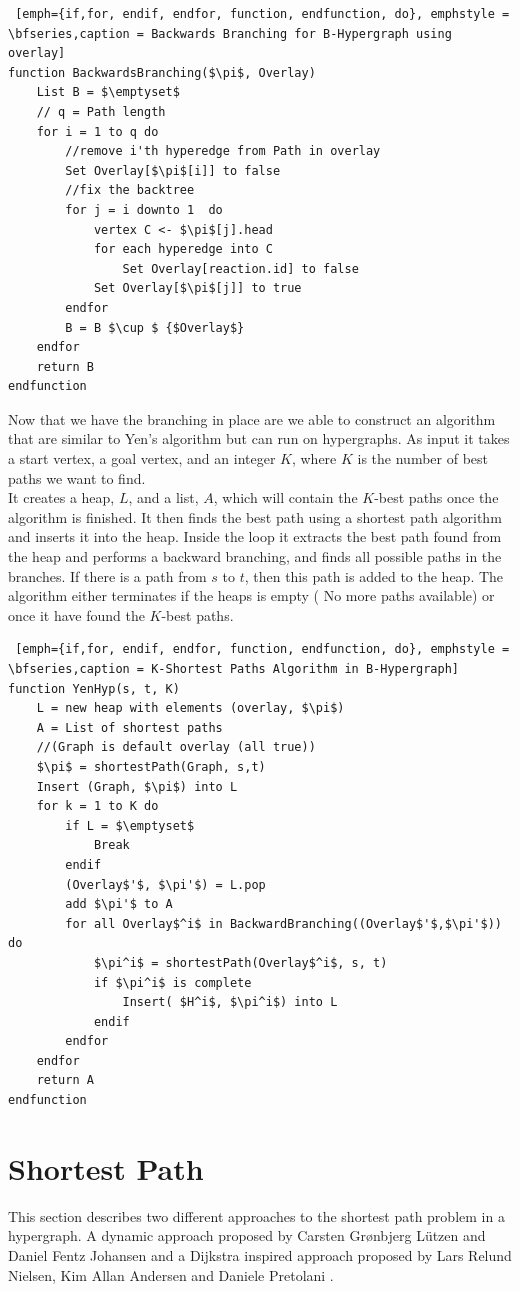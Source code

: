 \documentclass[a4paper,10pt,titlepage]{paper}
\begin{document}
\begin{lstlisting} [emph={if,for, endif, endfor, function, endfunction, do}, emphstyle = \bfseries,caption = Backwards Branching for B-Hypergraph using overlay]
function BackwardsBranching($\pi$, Overlay) 						
	List B = $\emptyset$
	// q = Path length
	for i = 1 to q do			
		//remove i'th hyperedge from Path in overlay					
		Set Overlay[$\pi$[i]] to false		
		//fix the backtree				
		for j = i downto 1	do							
			vertex C <- $\pi$[j].head
			for each hyperedge into C
				Set Overlay[reaction.id] to false
			Set Overlay[$\pi$[j]] to true
		endfor
		B = B $\cup $ {$Overlay$}
	endfor
	return B
endfunction
\end{lstlisting}
Now that we have the branching in place are we able to construct an algorithm that are similar to Yen's algorithm but can run on hypergraphs. As input it takes a start vertex, a goal vertex, and an integer $K$, where $K$ is the number of best paths we want to find.\\
It creates a heap, $L$, and a list, $A$, which will contain the $K$-best paths once the algorithm is finished. It then finds the best path using a shortest path algorithm and inserts it into the heap. Inside the loop it extracts the best path found from the heap and performs a backward branching, and finds all possible paths in the branches. If there is a path from $s$ to $t$, then this path is added to the heap. The algorithm either terminates if the heaps is empty ( No more paths available) or once it have found the $K$-best paths.
\begin{lstlisting} [emph={if,for, endif, endfor, function, endfunction, do}, emphstyle = \bfseries,caption = K-Shortest Paths Algorithm in B-Hypergraph]
function YenHyp(s, t, K) 
	L = new heap with elements (overlay, $\pi$)
	A = List of shortest paths
	//(Graph is default overlay (all true))
	$\pi$ = shortestPath(Graph, s,t) 				
	Insert (Graph, $\pi$) into L
	for k = 1 to K do
		if L = $\emptyset$
			Break
		endif
		(Overlay$'$, $\pi'$) = L.pop
		add $\pi'$ to A
		for all Overlay$^i$ in BackwardBranching((Overlay$'$,$\pi'$)) do
			$\pi^i$ = shortestPath(Overlay$^i$, s, t)
			if $\pi^i$ is complete
				Insert( $H^i$, $\pi^i$) into L
			endif
		endfor
	endfor
	return A
endfunction
\end{lstlisting}
\section{Shortest Path}
This section describes two different approaches to the shortest path problem in a hypergraph. A dynamic approach proposed by Carsten Grønbjerg Lützen and Daniel Fentz Johansen \cite{Carsten} and a Dijkstra inspired approach proposed by Lars Relund Nielsen, Kim Allan Andersen and Daniele Pretolani \cite{Nielsen}. 
\end{document}
